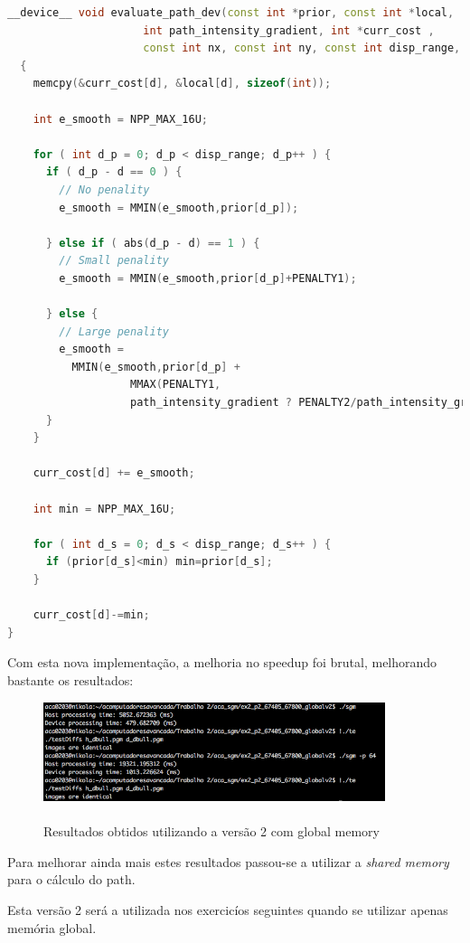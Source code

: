 \documentclass[pdftex,12pt,a4paper]{report}
\begin{document}
  \begin{lstlisting}[language=c++, basicstyle=\scriptsize]
__device__ void evaluate_path_dev(const int *prior, const int *local,
                     int path_intensity_gradient, int *curr_cost ,
                     const int nx, const int ny, const int disp_range, const int d)
  {
    memcpy(&curr_cost[d], &local[d], sizeof(int));
    
    int e_smooth = NPP_MAX_16U;
    
    for ( int d_p = 0; d_p < disp_range; d_p++ ) {
      if ( d_p - d == 0 ) {
        // No penality
        e_smooth = MMIN(e_smooth,prior[d_p]);
        
      } else if ( abs(d_p - d) == 1 ) {
        // Small penality
        e_smooth = MMIN(e_smooth,prior[d_p]+PENALTY1);
        
      } else {
        // Large penality
        e_smooth =
          MMIN(e_smooth,prior[d_p] +
                   MMAX(PENALTY1,
                   path_intensity_gradient ? PENALTY2/path_intensity_gradient : PENALTY2));
      }
    }

    curr_cost[d] += e_smooth;

    int min = NPP_MAX_16U;
    
    for ( int d_s = 0; d_s < disp_range; d_s++ ) {
      if (prior[d_s]<min) min=prior[d_s];
    }
    
    curr_cost[d]-=min;
}

\end{lstlisting} 

Com esta nova implementação, a melhoria no speedup foi brutal, melhorando bastante os resultados:

\begin{figure}[!htb]
\center
 \includegraphics[width=100mm,scale=1]{IteratePositionsV2.png}
 \caption{\\ Resultados obtidos utilizando a versão 2 com global memory}
 \label{fig:IteratePositionsV2}
\end{figure}

Para melhorar ainda mais estes resultados passou-se a utilizar a \textit{shared memory} para o cálculo do path.

Esta versão 2 será a utilizada nos exercicíos seguintes quando se utilizar apenas memória global.
\end{document}
